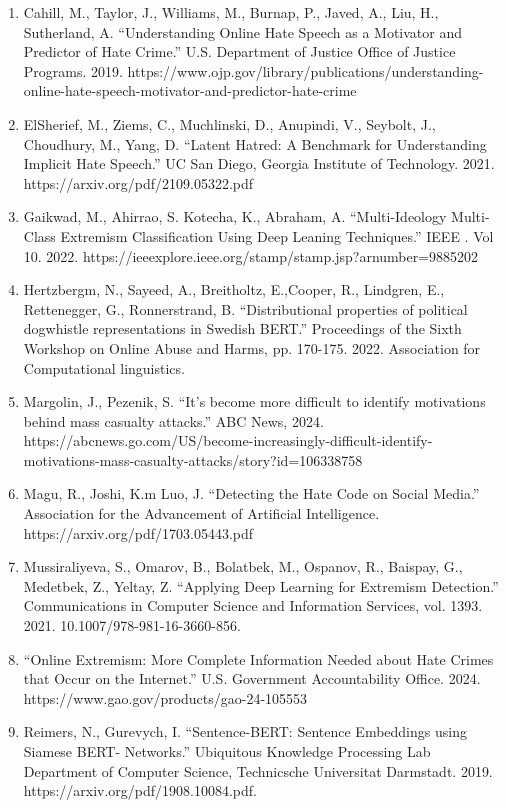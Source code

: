 \documentclass{article}
\begin{document}
\begin{enumerate}
\item Cahill, M., Taylor, J., Williams, M., Burnap, P., Javed, A., Liu, H., Sutherland, A. “Understanding Online Hate Speech as a Motivator and Predictor of Hate Crime.” U.S. Department of Justice Office of Justice Programs. 2019. https://www.ojp.gov/library/publications/understanding-online-hate-speech-motivator-and-predictor-hate-crime 
\item ElSherief, M., Ziems, C., Muchlinski, D., Anupindi, V., Seybolt, J., Choudhury, M., Yang, D. “Latent Hatred: A Benchmark for Understanding Implicit Hate Speech.” UC San Diego, Georgia Institute of Technology. 2021. https://arxiv.org/pdf/2109.05322.pdf
\item Gaikwad, M., Ahirrao, S. Kotecha, K., Abraham, A. “Multi-Ideology Multi-Class Extremism Classification Using Deep Leaning Techniques.” IEEE . Vol 10. 2022. https://ieeexplore.ieee.org/stamp/stamp.jsp?arnumber=9885202
\item Hertzbergm, N., Sayeed, A., Breitholtz, E.,Cooper, R., Lindgren, E., Rettenegger, G., Ronnerstrand, B. “Distributional properties of political dogwhistle representations in Swedish BERT.” Proceedings of the Sixth Workshop on Online Abuse and Harms, pp. 170-175. 2022. Association for Computational linguistics.
\item Margolin, J., Pezenik, S. “It’s become more difficult to identify motivations behind mass casualty attacks.” ABC News,  2024. https://abcnews.go.com/US/become-increasingly-difficult-identify-motivations-mass-casualty-attacks/story?id=106338758
\item Magu, R., Joshi, K.m Luo, J. “Detecting the Hate Code on Social Media.” Association for the Advancement of Artificial Intelligence. https://arxiv.org/pdf/1703.05443.pdf
\item Mussiraliyeva, S., Omarov, B., Bolatbek, M., Ospanov, R., Baispay, G., Medetbek, Z., Yeltay, Z. “Applying Deep Learning for Extremism Detection.” Communications in Computer Science and Information Services, vol. 1393. 2021. 10.1007/978-981-16-3660-856.
\item “Online Extremism: More Complete Information Needed about Hate Crimes that Occur on the Internet.” U.S. Government Accountability Office. 2024. https://www.gao.gov/products/gao-24-105553
\item Reimers, N., Gurevych, I. “Sentence-BERT: Sentence Embeddings using Siamese BERT-
Networks.” Ubiquitous Knowledge Processing Lab Department of Computer Science, Technicsche Universitat Darmstadt. 2019.  https://arxiv.org/pdf/1908.10084.pdf.
\end{enumerate}
\end{document}
